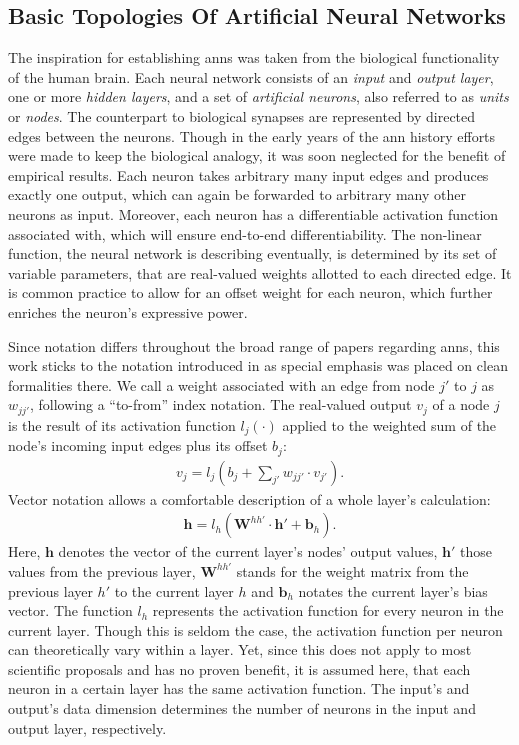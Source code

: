 \subsection{Basic Topologies Of Artificial Neural Networks}
\label{ssec:basic_topologies}
The inspiration for establishing \glspl{ann} was taken from the biological functionality of the human brain.
Each neural network consists of an \textit{input} and \textit{output layer}, one or more \textit{hidden layers}, and a set of \textit{artificial neurons}, also referred to as \textit{units} or \textit{nodes}.
The counterpart to biological synapses are represented by directed edges between the neurons.
Though in the early years of the \gls{ann} history efforts were made to keep the biological analogy, it was soon neglected for the benefit of empirical results.
Each neuron takes arbitrary many input edges and produces exactly one output, which can again be forwarded to arbitrary many other neurons as input.
Moreover, each neuron has a differentiable activation function associated with, which will ensure end-to-end differentiability.
The non-linear function, the neural network is describing eventually, is determined by its set of variable parameters, that are real-valued weights allotted to each directed edge.
It is common practice to allow for an offset weight for each neuron, which further enriches the neuron's expressive power.

Since notation differs throughout the broad range of papers regarding \glspl{ann}, this work sticks to the notation introduced in \cite{Lipton2015} as special emphasis was placed on clean formalities there.
We call a weight associated with an edge from node $j'$ to $j$ as $w_{jj'}$, following a ``to-from'' index notation.
The real-valued output $v_j$ of a node $j$ is the result of its activation function $l_j(\cdot)$ applied to the weighted sum of the node's incoming input edges plus its offset $b_j$:
\begin{align}
	\label{eq:fnn_single_weight}
	v_j = l_j \left( b_j + \sum\nolimits_{j'} w_{jj'} \cdot v_{j'}\right).
\end{align}
Vector notation allows a comfortable description of a whole layer's calculation:
\begin{align}
	\label{eq:fnn}
	\bm{h} = l_h \left( \bm{W}^{hh'} \cdot \bm{h}' + \bm{b}_h \right).
\end{align}
Here, $\bm{h}$ denotes the vector of the current layer's nodes' output values, $\bm{h}'$ those values from the previous layer,  $\bm{W}^{hh'}$ stands for the weight matrix from the previous layer $h'$ to the current layer $h$ and $\bm{b}_h$ notates the current layer's bias vector.
The function $l_h$ represents the activation function for every neuron in the current layer.
Though this is seldom the case, the activation function per neuron can theoretically vary within a layer.
Yet, since this does not apply to most scientific proposals and has no proven benefit, it is assumed here, that each neuron in a certain layer has the same activation function.
The input's and output's data dimension determines the number of neurons in the input and output layer, respectively.

